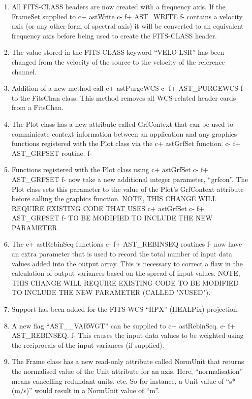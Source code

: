 \documentclass[twoside,11pt]{starlink}
\begin{document}
\begin{enumerate}



\item All FITS-CLASS headers are now created with a frequency axis. If the
FrameSet supplied to
c+
astWrite
c-
f+
AST\_WRITE
f-
contains a velocity axis (or any other form
of spectral axis) it will be converted to an equivalent frequency axis
before being used to create the FITS-CLASS header.

\item The value stored in the FITS-CLASS keyword ``VELO-LSR'' has been changed
from the velocity of the source to the velocity of the reference channel.

\item Addition of a new method call
c+
astPurgeWCS
c-
f+
AST\_PURGEWCS
f-
to the FitsChan
class. This method removes all WCS-related header cards from a FitsChan.

\item The Plot class has a new attribute called GrfContext that can be used
to comminicate context information between an application and any
graphics functions registered with the Plot class via the
c+
astGrfSet function.
c-
f+
AST\_GRFSET routine.
f-
\item Functions registered with the Plot class using
c+
astGrfSet
c-
f+
AST\_GRFSET
f-
now take a new additional integer parameter, ``grfcon''. The Plot class
sets this parameter to the value of the Plot's GrfContext attribute before
calling the graphics function. NOTE, THIS CHANGE WILL REQUIRE EXISTING
CODE THAT USES
c+
astGrfSet
c-
f+
AST\_GRFSET
f-
TO BE MODIFIED TO INCLUDE THE NEW PARAMETER.
\item The
c+
astRebinSeq functions
c-
f+
AST\_REBINSEQ routines
f-
now have an extra parameter that is used to record the total number of input
data values added into the output array. This is necessary to correct a
flaw in the calculation of output variances based on the spread of input
values. NOTE, THIS CHANGE WILL REQUIRE EXISTING CODE TO BE MODIFIED TO
INCLUDE THE NEW PARAMETER (CALLED "NUSED").
\item Support has been added for the FITS-WCS ``HPX'' (HEALPix) projection.
\item A new flag ``AST\_\_VARWGT'' can be supplied to
c+
astRebinSeq.
c-
f+
AST\_REBINSEQ.
f-
This causes the input data values to be weighted using the reciprocals of
the input variances (if supplied).

\item The Frame class has a new read-only attribute called NormUnit that
returns the normalised value of the Unit attribute for an axis. Here,
``normalisation'' means cancelling redundant units, etc. So for instance, a
Unit value of ``s*(m/s)'' would result in a NormUnit value of ``m''.


\end{enumerate}
\end{document}
